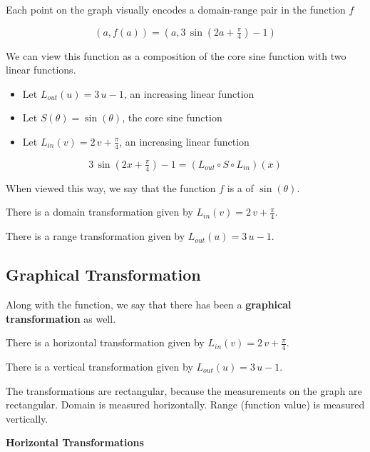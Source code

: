 \documentclass{ximera}
\begin{document}
Each point on the graph visually encodes a domain-range pair in the function $f$

\[  (a, f(a)) = (a, 3 \, \sin(2a+\tfrac{\pi}{4}) - 1)   \]




We can view this function as a composition of the core sine function with two linear functions.



\begin{itemize}
\item Let $L_{out}(u) = 3 \, u - 1$, an increasing linear function
\item Let $S(\theta) = \sin(\theta)$, the core sine function
\item Let $L_{in}(v) = 2 \, v + \tfrac{\pi}{4}$, an increasing linear function
\end{itemize}



\[ 3 \, \sin(2x + \tfrac{\pi}{4}) - 1  = (L_{out} \circ S \circ L_{in})(x)\]



When viewed this way, we say that the function $f$ is a  of $\sin(\theta)$.


There is a domain transformation given by $L_{in}(v) = 2 \, v + \tfrac{\pi}{4}$.

There is a range transformation given by $L_{out}(u) = 3 \, u - 1$.





\subsection*{Graphical Transformation}



Along with the function, we say that there has been a \textbf{graphical transformation} as well.



There is a horizontal transformation given by $L_{in}(v) = 2 \, v + \tfrac{\pi}{4}$.

There is a vertical transformation given by $L_{out}(u) = 3 \, u - 1$.




The transformations are rectangular, because the measurements on the graph are rectangular.  Domain is measured horizontally. Range (function value) is measured vertically.




\textbf{\textcolor{blue!55!black}{Horizontal Transformations}} 
\end{document}
